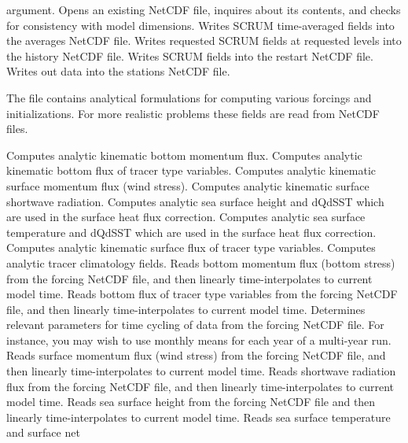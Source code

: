 \begin{klist}
\begin{klist}
   argument.
          Opens an existing NetCDF file, inquires
   about its contents, and checks for consistency with model dimensions.
         Writes SCRUM time-averaged fields into the
   averages NetCDF file.
         Writes requested SCRUM fields at requested
   levels into the history NetCDF file.
         Writes SCRUM fields into the restart NetCDF
   file.
      Writes out data into the stations NetCDF file.
   \end{klist}
 The file  contains analytical
formulations for computing various forcings and initializations.
For more realistic problems these fields are read from NetCDF files.
   \begin{klist}
       Computes analytic kinematic bottom
   momentum flux.
       Computes analytic kinematic bottom flux of
   tracer type variables.
       Computes analytic kinematic surface
   momentum flux (wind stress).
       Computes analytic kinematic surface
   shortwave radiation.
       Computes analytic sea surface height
   and dQdSST which are used in the surface heat flux correction.
       Computes analytic sea surface temperature
   and dQdSST which are used in the surface heat flux correction.
       Computes analytic kinematic surface
   flux of tracer type variables.
       Computes analytic tracer climatology fields.
       Reads bottom momentum flux (bottom stress)
   from the forcing NetCDF file, and then linearly
   time-interpolates to current model time.
       Reads bottom flux of  tracer type variables
   from the forcing NetCDF file, and then linearly
   time-interpolates to current model time.
        Determines relevant parameters for time
   cycling of data from the forcing NetCDF file.  For instance, you may
   wish to use monthly means for each year of a multi-year run.
       Reads surface  momentum  flux (wind stress)
   from the forcing NetCDF file, and then linearly
   time-interpolates to current model time.
       Reads shortwave radiation flux
   from the forcing NetCDF file, and then linearly
   time-interpolates to current model time.
       Reads sea surface height
   from the forcing NetCDF file and then linearly
   time-interpolates to current model time.
       Reads sea surface temperature and surface net

\end{klist}
\end{klist}
